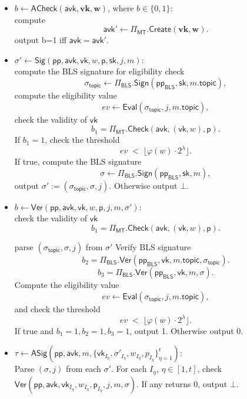 \documentclass{article}
\newcommand{\ppBLS}[0]{\mathsf{pp}_{\mathsf{BLS}}}
\newcommand{\sk}[0]{\mathsf{sk}}
\newcommand{\vk}[0]{\mathsf{vk}}
\newcommand{\avk}[0]{\mathsf{avk}}
\newcommand{\mkpth}[0]{\mathsf{p}}
\newcommand{\topic}[0]{\mathsf{topic}}
\begin{document}
\begin{itemize}
  \item $b \leftarrow \mathsf{ACheck}(\mathsf{avk},\mathbf{vk},\mathbf{w})$, where $b\in\{0,1\}$:\\
        compute
        \[
          \mathsf{avk'} \leftarrow \Pi_{\mathsf{MT}}.\mathsf{Create}(\mathbf{vk},\mathbf{w}).
        \]
        output b=1 iff $\mathsf{avk}=\mathsf{avk'}$. 

  \item $\sigma' \leftarrow \mathsf{Sig}(\mathsf{pp}, \avk,\vk, w, \mkpth,\sk, j, m)$:\\
        compute the BLS signature for eligibility check
        \[
          \sigma_\topic \leftarrow \Pi_{\mathsf{BLS}}.\mathsf{Sign}(\ppBLS, \sk, m.\topic),
        \]
        compute the eligibility value
        \[
          ev \leftarrow \mathsf{Eval}(\sigma_\topic, j, m.\topic),
        \]
        check the validity of $\vk$
        \[
            b_1 = \Pi_{\mathsf{MT}}.\mathsf{Check}(\avk,(\vk,w),\mkpth).
        \]
        If $b_1 = 1$, check the threshold 
        \[
          ev \;<\; \bigl\lfloor \varphi(w) \cdot 2^\lambda \bigr\rfloor.
        \]
        If true, compute the BLS signature
        \[
          \sigma \leftarrow \Pi_{\mathsf{BLS}}.\mathsf{Sign}(\ppBLS, \sk, m),
        \]
        output $\sigma' := (\sigma_\topic, \sigma, j)$. Otherwise output $\bot$.

    \item $b \leftarrow \mathsf{Ver}(\mathsf{pp}, \avk,\vk, w, \mkpth, j, m, \sigma' )$: \\
    check the validity of $\vk$
        \[
            b_1 = \Pi_{\mathsf{MT}}.\mathsf{Check}(\avk,(\vk,w),\mkpth).
        \]
        
    parse $(\sigma_\topic, \sigma, j)$ from $\sigma'$ %
        Verify BLS signature
        \[
         b_2 = \Pi_{\mathsf{BLS}}.\mathsf{Ver}(\ppBLS, \vk,m.\topic,\sigma_\topic).
        \]
        \[
         b_3 = \Pi_{\mathsf{BLS}}.\mathsf{Ver}(\ppBLS, \vk,m,\sigma).
        \]
        Compute the eligibility value
        \[
          ev \leftarrow \mathsf{Eval}(\sigma_\topic, j, m.\topic),
        \]
        and check the threshold
        \[
          ev \;<\; \bigl\lfloor \varphi(w) \cdot 2^\lambda \bigr\rfloor.
        \]
        If true and $b_1 = 1,b_2 = 1,b_3 = 1$, output 1. Otherwise output 0.



        \item $\tau \leftarrow \mathsf{ASig}(\mathsf{pp},\avk,  m, \{\vk_{I_\eta}, \sigma'_{I_\eta},w_{I_\eta},p_{I_\eta}\}_{\eta=1}^{t})$:\\
        Parse $(\sigma,j)$ from each $\sigma'$.
        For each $I_\eta$, $\eta\in[1,t]$, check $\mathsf{Ver}(\mathsf{pp}, \avk,\vk_{I_\eta}, w_{I_\eta}, \mkpth_{I_\eta}, j, m, \sigma)$. If any returns 0, output $\bot$.
        

\end{itemize}
\end{document}
